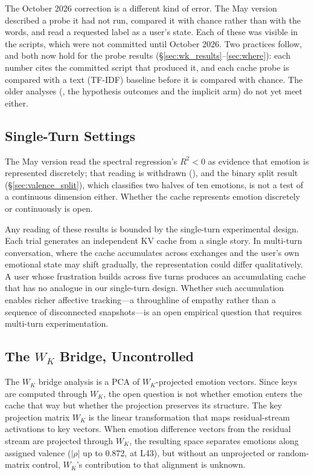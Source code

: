 \documentclass[11pt,a4paper]{article}
\begin{document}
The October 2026 correction is a different kind of error. The May version described a probe it had not run, compared it with chance rather than with the words, and read a requested label as a user's state. Each of these was visible in the scripts, which were not committed until October 2026. Two practices follow, and both now hold for the probe results (\S\ref{sec:wk_results}--\ref{sec:where}): each number cites the committed script that produced it, and each cache probe is compared with a text (TF-IDF) baseline before it is compared with chance. The older analyses (, the hypothesis outcomes and the implicit arm) do not yet meet either.

\subsection{Single-Turn Settings}

The May version read the spectral regression's $R^2 < 0$ as evidence that emotion is represented discretely; that reading is withdrawn (), and the binary split result (\S\ref{sec:valence_split}), which classifies two halves of ten emotions, is not a test of a continuous dimension either. Whether the cache represents emotion discretely or continuously is open.

Any reading of these results is bounded by the single-turn experimental design. Each trial generates an independent KV cache from a single story. In multi-turn conversation, where the cache accumulates across exchanges and the user's own emotional state may shift gradually, the representation could differ qualitatively. A user whose frustration builds across five turns produces an accumulating cache that has no analogue in our single-turn design. Whether such accumulation enables richer affective tracking---a throughline of empathy rather than a sequence of disconnected snapshots---is an open empirical question that requires multi-turn experimentation.

\subsection{The $W_K$ Bridge, Uncontrolled}

The $W_K$ bridge analysis is a PCA of $W_K$-projected emotion vectors. Since keys are computed through $W_K$, the open question is not whether emotion enters the cache that way but whether the projection preserves its structure. The key projection matrix $W_K$ is the linear transformation that maps residual-stream activations to key vectors. When emotion difference vectors from the residual stream are projected through $W_K$, the resulting space separates emotions along assigned valence ($|\rho|$ up to 0.872, at L43), but without an unprojected or random-matrix control, $W_K$'s contribution to that alignment is unknown.
\end{document}
